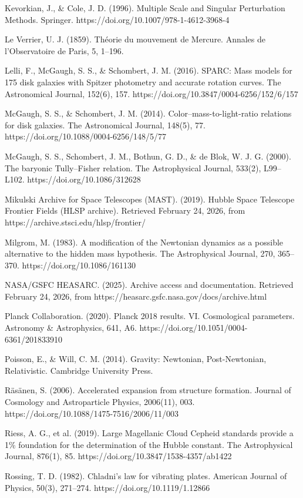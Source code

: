 \documentclass[11pt]{article}
\begin{document}
Kevorkian, J., \& Cole, J. D. (1996). Multiple Scale and Singular Perturbation Methods. Springer. https://doi.org/10.1007/978-1-4612-3968-4

Le Verrier, U. J. (1859). Théorie du mouvement de Mercure. Annales de l'Observatoire de Paris, 5, 1--196.

Lelli, F., McGaugh, S. S., \& Schombert, J. M. (2016). SPARC: Mass models for 175 disk galaxies with Spitzer photometry and accurate rotation curves. The Astronomical Journal, 152(6), 157. https://doi.org/10.3847/0004-6256/152/6/157

McGaugh, S. S., \& Schombert, J. M. (2014). Color--mass-to-light-ratio relations for disk galaxies. The Astronomical Journal, 148(5), 77. https://doi.org/10.1088/0004-6256/148/5/77

McGaugh, S. S., Schombert, J. M., Bothun, G. D., \& de Blok, W. J. G. (2000). The baryonic Tully--Fisher relation. The Astrophysical Journal, 533(2), L99--L102. https://doi.org/10.1086/312628

Mikulski Archive for Space Telescopes (MAST). (2019). Hubble Space Telescope Frontier Fields (HLSP archive). Retrieved February 24, 2026, from https://archive.stsci.edu/hlsp/frontier/

Milgrom, M. (1983). A modification of the Newtonian dynamics as a possible alternative to the hidden mass hypothesis. The Astrophysical Journal, 270, 365--370. https://doi.org/10.1086/161130

NASA/GSFC HEASARC. (2025). Archive access and documentation. Retrieved February 24, 2026, from https://heasarc.gsfc.nasa.gov/docs/archive.html

Planck Collaboration. (2020). Planck 2018 results. VI. Cosmological parameters. Astronomy \& Astrophysics, 641, A6. https://doi.org/10.1051/0004-6361/201833910

Poisson, E., \& Will, C. M. (2014). Gravity: Newtonian, Post-Newtonian, Relativistic. Cambridge University Press.

Räsänen, S. (2006). Accelerated expansion from structure formation. Journal of Cosmology and Astroparticle Physics, 2006(11), 003. https://doi.org/10.1088/1475-7516/2006/11/003

Riess, A. G., et al. (2019). Large Magellanic Cloud Cepheid standards provide a 1\% foundation for the determination of the Hubble constant. The Astrophysical Journal, 876(1), 85. https://doi.org/10.3847/1538-4357/ab1422

Rossing, T. D. (1982). Chladni's law for vibrating plates. American Journal of Physics, 50(3), 271--274. https://doi.org/10.1119/1.12866
\end{document}
